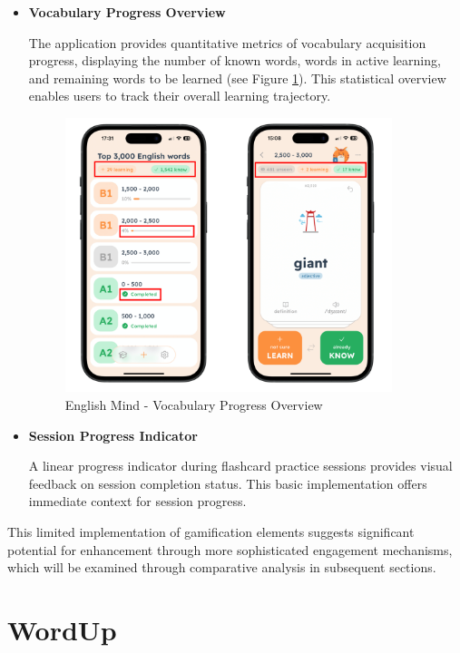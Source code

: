 \begin{itemize}
    \item \textbf{Vocabulary Progress Overview} 
    \label{chap:em-progess-tracking}
    
    The application provides quantitative metrics of vocabulary acquisition progress, displaying the number of known words, words in active learning, and remaining words to be learned (see Figure \ref{fig:em-progress-tracking}). This statistical overview enables users to track their overall learning trajectory.

    \begin{figure}[!h]
        \includegraphics[width=0.9\textwidth]{src/figures/em-progress-tracking.png}
        \caption{English Mind - Vocabulary Progress Overview}
        \label{fig:em-progress-tracking}
    \end{figure}

    \item \textbf{Session Progress Indicator}
    
    A linear progress indicator during flashcard practice sessions provides visual feedback on session completion status. This basic implementation offers immediate context for session progress.
    
\end{itemize}

This limited implementation of gamification elements suggests significant potential for enhancement through more sophisticated engagement mechanisms, which will be examined through comparative analysis in subsequent sections.

\section{WordUp}

